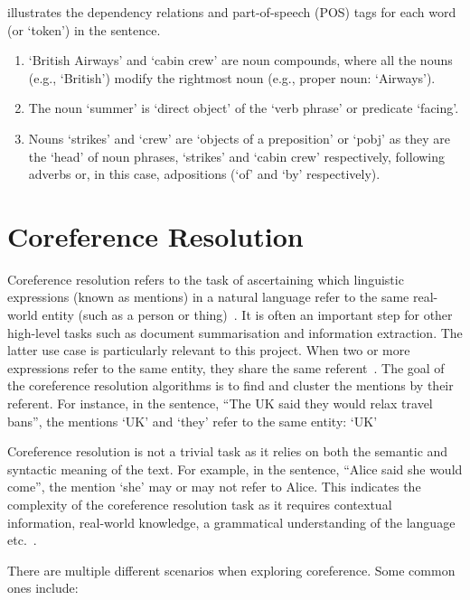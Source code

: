  illustrates the dependency relations and part-of-speech (POS) tags for each word (or `token') in the sentence. 

\begin{enumerate}
    \item `British Airways' and `cabin crew' are noun compounds, where all the nouns (e.g., `British') modify the rightmost noun (e.g., proper noun: `Airways').
    \item The noun `summer' is `direct object' of the `verb phrase' or predicate `facing'.
    \item Nouns `strikes' and `crew' are `objects of a preposition' or `pobj' as they are the `head' of noun phrases, `strikes' and `cabin crew' respectively, following adverbs or, in this case, adpositions (`of' and `by' respectively).

\end{enumerate}
 

\section{Coreference Resolution}

Coreference resolution refers to the task of ascertaining which linguistic expressions (known as mentions) in a natural language refer to the same real-world entity (such as a person or thing)~\cite{zheng2011coreference}. It is often an important step for other high-level tasks such as document summarisation and information extraction. The latter use case is particularly relevant to this project. When two or more expressions refer to the same entity, they share the same referent~\cite{wiki_coref}. The goal of the coreference resolution algorithms is to find and cluster the mentions by their referent. For instance, in the sentence, ``The UK said they would relax travel bans'', the mentions `UK' and `they' refer to the same entity: `UK'

Coreference resolution is not a trivial task as it relies on both the semantic and syntactic meaning of the text. For example, in the sentence, ``Alice said she would come'', the mention `she' may or may not refer to Alice.  This indicates the complexity of the coreference resolution task as it requires contextual information, real-world knowledge, a grammatical understanding of the language etc.~\cite{zheng2011coreference}.

There are multiple different scenarios when exploring coreference. Some common ones include: 

